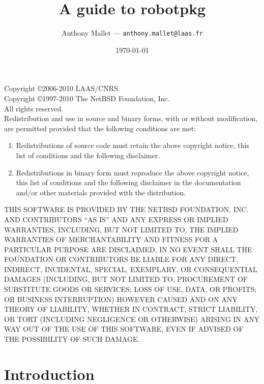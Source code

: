 \documentclass[a4paper,11pt]{book}
\title{A guide to robotpkg}
\author{Anthony Mallet --- {\tt anthony.mallet@laas.fr}}
\date{\today}
\begin{document}

\frontmatter
\maketitle

{\small\parindent0pt
Copyright \copyright 2006-2010 LAAS/CNRS.\\
Copyright \copyright 1997-2010 The NetBSD Foundation, Inc.\\
All rights reserved.\\

Redistribution and use in source and binary forms, with or without
modification, are permitted provided that the following conditions
are met:

\begin{enumerate}
\item Redistributions of source code must retain the above copyright
      notice, this list of conditions and the following disclaimer.

\item Redistributions in binary form must reproduce the above copyright
      notice, this list of conditions and the following disclaimer in the
      documentation and/or other materials provided with the distribution.
\end{enumerate}

THIS SOFTWARE IS PROVIDED BY THE NETBSD FOUNDATION, INC. AND CONTRIBUTORS
``AS IS'' AND ANY EXPRESS OR IMPLIED WARRANTIES, INCLUDING, BUT NOT LIMITED
TO, THE IMPLIED WARRANTIES OF MERCHANTABILITY AND FITNESS FOR A PARTICULAR
PURPOSE ARE DISCLAIMED.  IN NO EVENT SHALL THE FOUNDATION OR CONTRIBUTORS
BE LIABLE FOR ANY DIRECT, INDIRECT, INCIDENTAL, SPECIAL, EXEMPLARY, OR
CONSEQUENTIAL DAMAGES (INCLUDING, BUT NOT LIMITED TO, PROCUREMENT OF
SUBSTITUTE GOODS OR SERVICES; LOSS OF USE, DATA, OR PROFITS; OR BUSINESS
INTERRUPTION) HOWEVER CAUSED AND ON ANY THEORY OF LIABILITY, WHETHER IN
CONTRACT, STRICT LIABILITY, OR TORT (INCLUDING NEGLIGENCE OR OTHERWISE)
ARISING IN ANY WAY OUT OF THE USE OF THIS SOFTWARE, EVEN IF ADVISED OF THE
POSSIBILITY OF SUCH DAMAGE.
}


\tableofcontents
\mainmatter

\chapter{Introduction}
\label{chapter:introduction}

\end{document}
